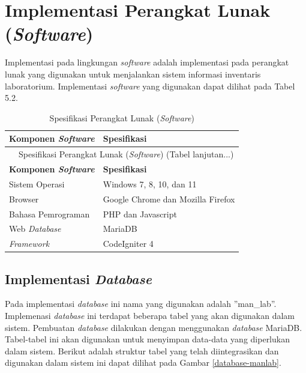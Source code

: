 \section{Implementasi Perangkat Lunak (\textit{Software})}
Implementasi pada lingkungan \textit{software} adalah implementasi pada perangkat lunak yang digunakan untuk menjalankan sistem informasi inventaris laboratorium. Implementasi \textit{software} yang digunakan dapat dilihat pada Tabel 5.2.

\begin{longtable}{l l}
	\caption{Spesifikasi Perangkat Lunak (\textit{Software})}                                                               \\
	\hline
	\textbf{Komponen \textit{Software}} & \textbf{Spesifikasi}                                                              \\
	\hline
	\endfirsthead

	\multicolumn{2}{c}{\tablename\ \thetable\ {Spesifikasi Perangkat Lunak (\textit{Software})} \space (Tabel lanjutan...)} \\
	\hline
	\textbf{Komponen \textit{Software}} & \textbf{Spesifikasi}                                                              \\
	\hline
	\endhead

	Sistem Operasi                      & Windows 7, 8, 10, dan 11                                                          \\
	Browser                             & Google Chrome dan Mozilla Firefox                                                 \\
	Bahasa Pemrograman                  & PHP dan Javascript                                                                \\
	Web \textit{Database}               & MariaDB                                                                           \\
	\textit{Framework}                  & CodeIgniter 4                                                                     \\
	\hline
\end{longtable}

\subsection{Implementasi \textit{Database}}
Pada implementasi \textit{database} ini nama yang digunakan adalah ”man\_lab”. Implemenasi \textit{database} ini terdapat beberapa tabel yang akan digunakan dalam sistem. Pembuatan \textit{database} dilakukan dengan menggunakan \textit{database} MariaDB. Tabel-tabel ini akan digunakan untuk menyimpan data-data yang diperlukan dalam sistem. Berikut adalah struktur tabel yang telah diintegrasikan dan digunakan dalam sistem ini dapat dilihat pada Gambar \ref{database-manlab}.



